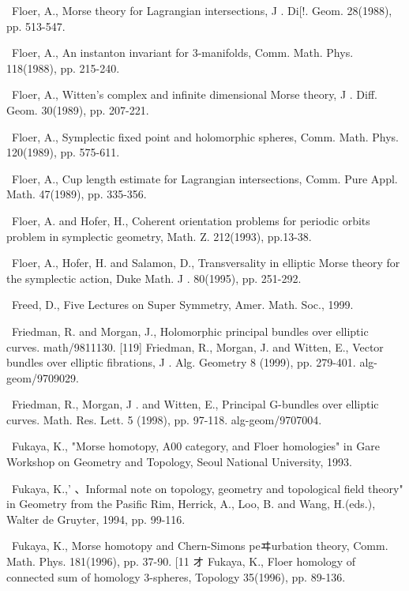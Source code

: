 {\noindent [103]\ Floer, A., Morse theory for Lagrangian intersections, J . Di[!. Geom. 28(1988), pp. 513-547.\par\smallskip
\noindent [104]\ Floer, A., An instanton invariant for 3-manifolds, Comm. Math. Phys. 118(1988), pp. 215-240.\par\smallskip
\noindent [105]\ Floer, A., Witten's complex and infinite dimensional Morse theory, J . Diff. Geom. 30(1989), pp. 207-221.\par\smallskip
\noindent [106]\ Floer, A., Symplectic fixed point and holomorphic spheres, Comm. Math. Phys. 120(1989), pp. 575-611.\par\smallskip
\noindent [107]\ Floer, A., Cup length estimate for Lagrangian intersections, Comm. Pure Appl. Math. 47(1989), pp. 335-356.\par\smallskip
\noindent [108]\ Floer, A. and Hofer, H., Coherent orientation problems for periodic orbits problem in symplectic geometry, Math. Z. 212(1993), pp.13-38.\par\smallskip
\noindent [109]\ Floer, A., Hofer, H. and Salamon, D., Transversality in elliptic Morse theory for the symplectic action, Duke Math. J . 80(1995), pp. 251-292.\par\smallskip
\noindent [110]\ Freed, D., Five Lectures on Super Symmetry, Amer. Math. Soc., 1999.\par\smallskip
\noindent [111]\ Friedman, R. and Morgan, J., Holomorphic principal bundles over elliptic curves. math/9811130. [119] Friedman, R., Morgan, J. and Witten, E., Vector bundles over elliptic fibrations, J . Alg. Geometry 8 (1999), pp. 279-401. alg-geom/9709029.\par\smallskip
\noindent [113]\ Friedman, R., Morgan, J . and Witten, E., Principal G-bundles over elliptic curves. Math. Res. Lett. 5 (1998), pp. 97-118. alg-geom/9707004.\par\smallskip
\noindent [114]\ Fukaya, K., "Morse homotopy, A00 category, and Floer homologies" in Gare Workshop on Geometry and Topology, Seoul National University, 1993.\par\smallskip
\noindent [115]\ Fukaya, K.,' 、Informal note on topology, geometry and topological field theory" in Geometry from the Pasific Rim, Herrick, A., Loo, B. and Wang, H.(eds.), Walter de Gruyter, 1994, pp. 99-116.\par\smallskip
\noindent [116]\ Fukaya, K., Morse homotopy and Chern-Simons peヰurbation theory, Comm. Math. Phys. 181(1996), pp. 37-90. [11 オ Fukaya, K., Floer homology of connected sum of homology 3-spheres, Topology 35(1996), pp. 89-136.\par\smallskip
}
